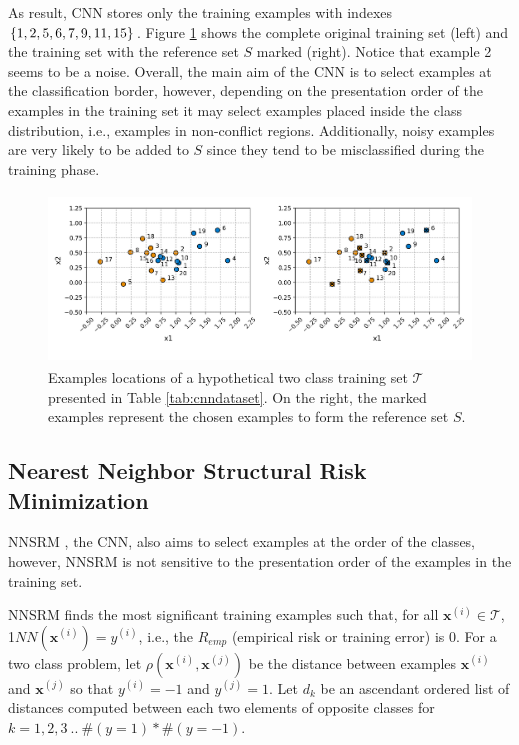 \vspace{0.4cm}

As result, CNN stores only the training examples with indexes $\{1,2,5,\\6,7,9,11,15\}$. Figure \ref{fig:cnndataset} shows the complete original training set (left) and the training set with the reference set $S$ marked (right). Notice that example 2 seems to be a noise. Overall, the main aim of the CNN is to select examples at the classification border, however, depending on the presentation order of the examples in the training set it may select examples placed inside the class distribution, i.e., examples in non-conflict regions. Additionally, noisy examples are very likely to be added to $S$ since they tend to be misclassified during the training phase.%

\begin{figure}[h]
    \centering
    \includegraphics[height = 4.5cm, width =  12cm]{"Part 3 - Learning Systems/Supervised Learning/k-Nearest Neighbors/figures/cnndataset.png"}
    \caption{Examples locations of a hypothetical two class training set $\mathcal{T}$ presented in Table \ref{tab:cnndataset}. On the right, the marked examples represent the chosen examples to form the reference set $S$.}
    \label{fig:cnndataset}
\end{figure}

\subsection{Nearest Neighbor Structural Risk Minimization}

NNSRM \cite{nnsrm:2003}, the CNN, also aims to select examples at the order of the classes, however, NNSRM is not sensitive to the presentation order of the examples in the training set. 

NNSRM finds the most significant training examples such that, for all $\mathbf{x}^{(i)} \in \mathcal{T}$, 1$NN(\mathbf{x}^{(i)}) = y^{(i)}$, i.e., the $R_{emp}$ (empirical risk or training error) is 0. For a two class problem, let $\rho(\mathbf{x}^{(i)},\mathbf{x}^{(j)})$ be the distance between examples $\mathbf{x}^{(i)}$ and $\mathbf{x}^{(j)}$ so that $y^{(i)} = -1$ and $y^{(j)} = 1$. Let $d_k$ be an ascendant ordered list of distances computed between each two elements of opposite classes for $k = 1, 2, 3 \: .. \: \#(y=1) * \#(y=-1)$.

